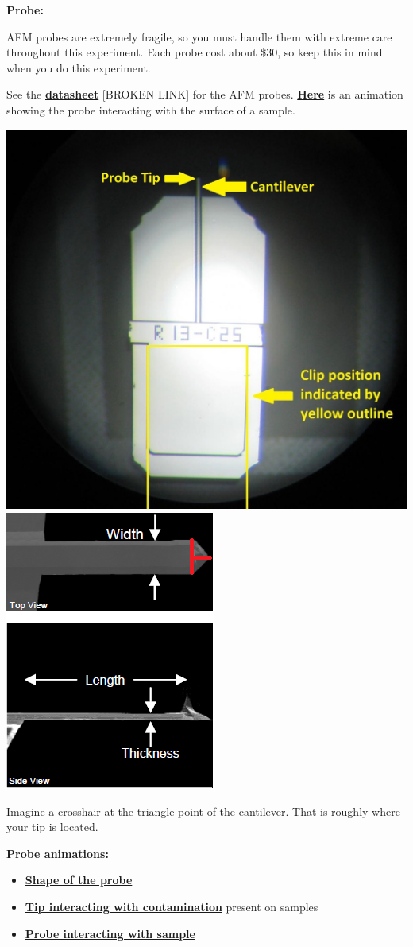 \documentclass{../lab}
\begin{document}
\noindent\textbf{Probe:}

AFM probes are extremely fragile, so you must handle them with extreme care throughout this experiment.  Each probe cost about \$30, so keep this in mind when you do this experiment.

See the \href{http://experimentationlab.berkeley.edu/sites/default/files/AFMImages/ACLA\_4\_datasheet.pdf}{\textbf{datasheet}} [BROKEN LINK] for the AFM probes. \href{http://experimentationlab.berkeley.edu/sites/default/files/AFMImages/1.1.\%20Generating\%20an\%20image.flv\_converted.mp4}{\textbf{Here}} is an animation showing the probe interacting with the surface of a sample.

\begin{center}
    \href{http://experimentationlab.berkeley.edu/sites/default/files/AFMImages/AFMprobe.JPG}{\includegraphics[width=0.33\linewidth,keepaspectratio]{images/AFMprobe.JPG}}
    \href{http://experimentationlab.berkeley.edu/sites/default/files/AFMImages/26.png}{\includegraphics[width=0.33\linewidth,keepaspectratio]{images/26.png}}
\end{center}

Imagine a crosshair at the triangle point of the cantilever. That is roughly where your tip is located.

\noindent\textbf{Probe animations:}

\begin{itemize}
    \item \href{http://experimentationlab.berkeley.edu/sites/default/files/AFMImages/5.2.\%20Probe\%20Shape\%20-\%20Hole.flv\_converted.mp4}{\textbf{Shape of the probe}}

    \item \href{http://experimentationlab.berkeley.edu/sites/default/files/AFMImages/5.1\%20Contamination.flv\_converted.mp4}{\textbf{Tip interacting with contamination}} present on samples

    \item \href{http://experimentationlab.berkeley.edu/sites/default/files/AFMImages/5.3.\%20Probe\%20Sample\%20Bump.flv\_converted.mp4}{\textbf{Probe interacting with sample}}

\end{itemize}
\end{document}

